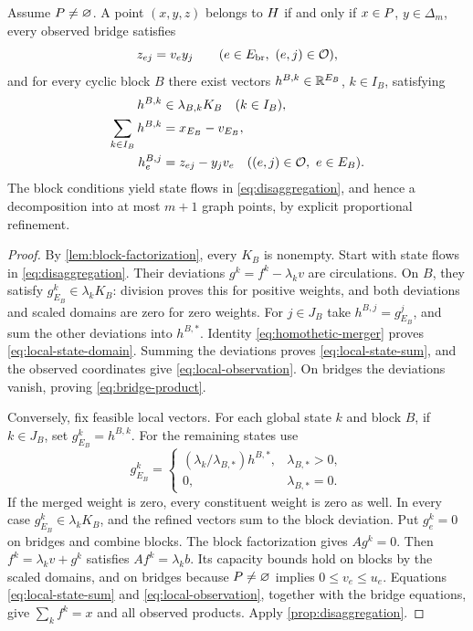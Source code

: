 \begin{theorem}\label{thm:block-state-reduction}
Assume $P\ne\varnothing$. A point $(x,y,z)$ belongs to $H$ if and
only if $x\in P$, $y\in\Delta_m$, every observed bridge satisfies
\begin{equation}\label{eq:bridge-product}
 z_{ej}=v_e y_j\qquad(e\in E_{\rm br},\ (e,j)\in\mathcal O),
\end{equation}
and for every cyclic block $B$ there exist vectors
$h^{B,k}\in\mathbb R^{E_B}$, $k\in I_B$, satisfying
\begin{align}
 h^{B,k}&\in\lambda_{B,k}K_B\quad(k\in I_B),\label{eq:local-state-domain}\\
 \sum_{k\in I_B}h^{B,k}&=x_{E_B}-v_{E_B},\label{eq:local-state-sum}\\
 h^{B,j}_e&=z_{ej}-y_jv_e
       \quad((e,j)\in\mathcal O,\ e\in E_B).\label{eq:local-observation}
\end{align}
The block conditions yield state flows in
\eqref{eq:disaggregation}, and hence a decomposition into at most $m+1$
graph points, by explicit proportional refinement.
\end{theorem}
\begin{proof}
By \cref{lem:block-factorization}, every $K_B$ is nonempty. Start with
state flows in \eqref{eq:disaggregation}. Their deviations
$g^k=f^k-\lambda_k v$ are circulations. On $B$, they satisfy
$g^k_{E_B}\in\lambda_kK_B$: division proves this for positive weights,
and both deviations and scaled domains are zero for zero weights.
For $j\in J_B$ take $h^{B,j}=g^j_{E_B}$, and sum the other deviations
into $h^{B,*}$. Identity \eqref{eq:homothetic-merger} proves
\eqref{eq:local-state-domain}. Summing the deviations proves
\eqref{eq:local-state-sum}, and the observed coordinates give
\eqref{eq:local-observation}. On bridges the deviations vanish, proving
\eqref{eq:bridge-product}.

Conversely, fix feasible local vectors. For each global state $k$ and block
$B$, if $k\in J_B$, set $g^k_{E_B}=h^{B,k}$. For the remaining states use
\begin{equation}\label{eq:proportional-refinement}
 g^k_{E_B}=\begin{cases}
 (\lambda_k/\lambda_{B,*})h^{B,*},&\lambda_{B,*}>0,\\
 0,&\lambda_{B,*}=0.
 \end{cases}
\end{equation}
If the merged weight is zero, every constituent weight is zero as well.
In every case $g^k_{E_B}\in\lambda_kK_B$, and the refined vectors sum to
the block deviation. Put $g^k_e=0$ on bridges and combine blocks. The block
factorization gives $Ag^k=0$. Then $f^k=\lambda_kv+g^k$ satisfies
$Af^k=\lambda_kb$. Its capacity bounds hold on blocks by the scaled
domains, and on bridges because $P\ne\varnothing$ implies
$0\le v_e\le u_e$. Equations \eqref{eq:local-state-sum} and
\eqref{eq:local-observation}, together with the bridge equations, give
$\sum_kf^k=x$ and all observed products. Apply
\cref{prop:disaggregation}.
\end{proof}

